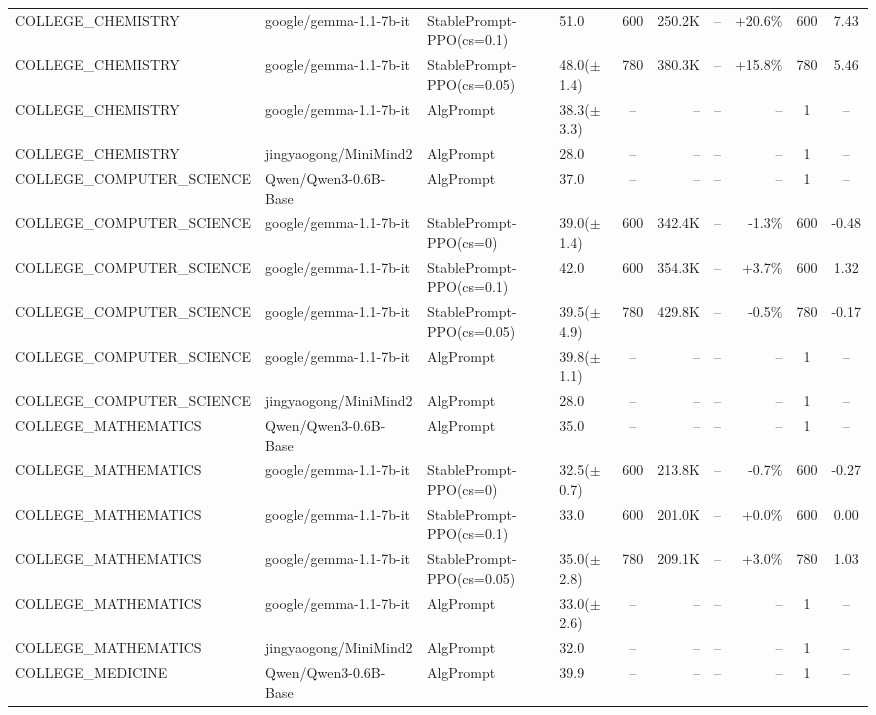 {\begin{longtable}{@{}p{5.5cm}p{4.5cm}p{2.5cm}lcrrrcc@{}}
COLLEGE\_CHEMISTRY & google/gemma-1.1-7b-it & StablePrompt-PPO(cs=0.1) & 51.0 & 600 & 250.2K & -- & +20.6\% & 600 & 7.43 \\
COLLEGE\_CHEMISTRY & google/gemma-1.1-7b-it & StablePrompt-PPO(cs=0.05) & 48.0($\pm$1.4) & 780 & 380.3K & -- & +15.8\% & 780 & 5.46 \\
COLLEGE\_CHEMISTRY & google/gemma-1.1-7b-it & AlgPrompt & 38.3($\pm$3.3) & -- & -- & -- & -- & 1 & -- \\
\midrule
COLLEGE\_CHEMISTRY & jingyaogong/MiniMind2 & AlgPrompt & 28.0 & -- & -- & -- & -- & 1 & -- \\
\midrule
COLLEGE\_COMPUTER\_SCIENCE & Qwen/Qwen3-0.6B-Base & AlgPrompt & 37.0 & -- & -- & -- & -- & 1 & -- \\
\midrule
COLLEGE\_COMPUTER\_SCIENCE & google/gemma-1.1-7b-it & StablePrompt-PPO(cs=0) & 39.0($\pm$1.4) & 600 & 342.4K & -- & -1.3\% & 600 & -0.48 \\
COLLEGE\_COMPUTER\_SCIENCE & google/gemma-1.1-7b-it & StablePrompt-PPO(cs=0.1) & 42.0 & 600 & 354.3K & -- & +3.7\% & 600 & 1.32 \\
COLLEGE\_COMPUTER\_SCIENCE & google/gemma-1.1-7b-it & StablePrompt-PPO(cs=0.05) & 39.5($\pm$4.9) & 780 & 429.8K & -- & -0.5\% & 780 & -0.17 \\
COLLEGE\_COMPUTER\_SCIENCE & google/gemma-1.1-7b-it & AlgPrompt & 39.8($\pm$1.1) & -- & -- & -- & -- & 1 & -- \\
\midrule
COLLEGE\_COMPUTER\_SCIENCE & jingyaogong/MiniMind2 & AlgPrompt & 28.0 & -- & -- & -- & -- & 1 & -- \\
\midrule
COLLEGE\_MATHEMATICS & Qwen/Qwen3-0.6B-Base & AlgPrompt & 35.0 & -- & -- & -- & -- & 1 & -- \\
\midrule
COLLEGE\_MATHEMATICS & google/gemma-1.1-7b-it & StablePrompt-PPO(cs=0) & 32.5($\pm$0.7) & 600 & 213.8K & -- & -0.7\% & 600 & -0.27 \\
COLLEGE\_MATHEMATICS & google/gemma-1.1-7b-it & StablePrompt-PPO(cs=0.1) & 33.0 & 600 & 201.0K & -- & +0.0\% & 600 & 0.00 \\
COLLEGE\_MATHEMATICS & google/gemma-1.1-7b-it & StablePrompt-PPO(cs=0.05) & 35.0($\pm$2.8) & 780 & 209.1K & -- & +3.0\% & 780 & 1.03 \\
COLLEGE\_MATHEMATICS & google/gemma-1.1-7b-it & AlgPrompt & 33.0($\pm$2.6) & -- & -- & -- & -- & 1 & -- \\
\midrule
COLLEGE\_MATHEMATICS & jingyaogong/MiniMind2 & AlgPrompt & 32.0 & -- & -- & -- & -- & 1 & -- \\
\midrule
COLLEGE\_MEDICINE & Qwen/Qwen3-0.6B-Base & AlgPrompt & 39.9 & -- & -- & -- & -- & 1 & -- \\

\end{longtable}}
